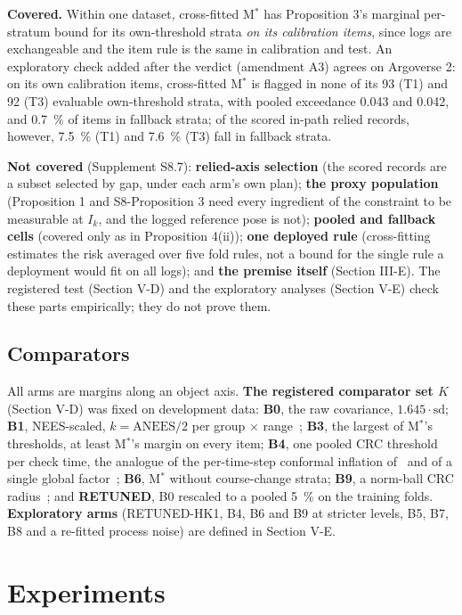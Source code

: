 \documentclass{ieeeaccess}
\begin{document}
\textbf{Covered.} Within one dataset, cross-fitted M$^{*}$ has Proposition 3's marginal per-stratum bound for its own-threshold strata \emph{on its calibration items}, since logs are exchangeable and the item rule is the same in calibration and test. An exploratory check added after the verdict (amendment A3) agrees on Argoverse 2: on its own calibration items, cross-fitted M$^{*}$ is flagged in none of its 93 (T1) and 92 (T3) evaluable own-threshold strata, with pooled exceedance 0.043 and 0.042, and 0.7~\% of items in fallback strata; of the scored in-path relied records, however, 7.5~\% (T1) and 7.6~\% (T3) fall in fallback strata.

\textbf{Not covered} (Supplement S8.7): \textbf{relied-axis selection} (the scored records are a subset selected by gap, under each arm's own plan); \textbf{the proxy population} (Proposition 1 and S8-Proposition 3 need every ingredient of the constraint to be measurable at $I_{k}$, and the logged reference pose is not); \textbf{pooled and fallback cells} (covered only as in Proposition 4(ii)); \textbf{one deployed rule} (cross-fitting estimates the risk averaged over five fold rules, not a bound for the single rule a deployment would fit on all logs); and \textbf{the premise itself} (Section III-E). The registered test (Section V-D) and the exploratory analyses (Section V-E) check these parts empirically; they do not prove them.

\subsection{Comparators}
All arms are margins along an object axis. \textbf{The registered comparator set $K$} (Section V-D) was fixed on development data: \textbf{B0}, the raw covariance, $1.645\cdot\mathrm{sd}$; \textbf{B1}, NEES-scaled, $k = \mathrm{ANEES}/2$ per group $\times$ range~\cite{BarShalom2001,Osterburg2026}; \textbf{B3}, the largest of M$^{*}$'s thresholds, at least M$^{*}$'s margin on every item; \textbf{B4}, one pooled CRC threshold per check time, the analogue of the per-time-step conformal inflation of~\cite{Weisman2026} and of a single global factor~\cite{Marques2026b}; \textbf{B6}, M$^{*}$ without course-change strata; \textbf{B9}, a norm-ball CRC radius~\cite{Lindemann2023,Dixit2023}; and \textbf{RETUNED}, B0 rescaled to a pooled 5~\% on the training folds. \textbf{Exploratory arms} (RETUNED-HK1, B4, B6 and B9 at stricter levels, B5, B7, B8 and a re-fitted process noise) are defined in Section V-E.

\section{Experiments}
\end{document}
